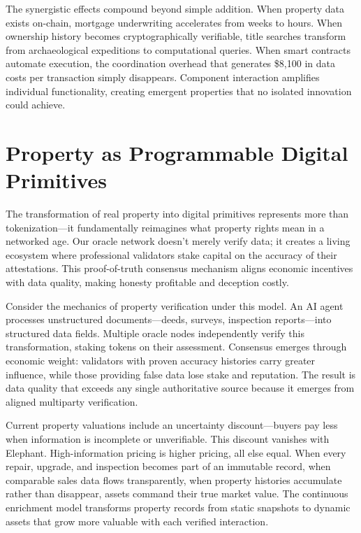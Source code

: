 The synergistic effects compound beyond simple addition. When property data exists on-chain, mortgage underwriting accelerates from weeks to hours. When ownership history becomes cryptographically verifiable, title searches transform from archaeological expeditions to computational queries. When smart contracts automate execution, the coordination overhead that generates \$8{,}100 in data costs per transaction simply disappears. Component interaction amplifies individual functionality, creating emergent properties that no isolated innovation could achieve.

\section{Property as Programmable Digital Primitives}

The transformation of real property into digital primitives represents more than tokenization—it fundamentally reimagines what property rights mean in a networked age. Our oracle network doesn't merely verify data; it creates a living ecosystem where professional validators stake capital on the accuracy of their attestations. This proof-of-truth consensus mechanism aligns economic incentives with data quality, making honesty profitable and deception costly.

Consider the mechanics of property verification under this model. An AI agent processes unstructured documents—deeds, surveys, inspection reports—into structured data fields. Multiple oracle nodes independently verify this transformation, staking tokens on their assessment. Consensus emerges through economic weight: validators with proven accuracy histories carry greater influence, while those providing false data lose stake and reputation. The result is data quality that exceeds any single authoritative source because it emerges from aligned multiparty verification.

Current property valuations include an uncertainty discount—buyers pay less when information is incomplete or unverifiable. This discount vanishes with Elephant. High-information pricing is higher pricing, all else equal. When every repair, upgrade, and inspection becomes part of an immutable record, when comparable sales data flows transparently, when property histories accumulate rather than disappear, assets command their true market value. The continuous enrichment model transforms property records from static snapshots to dynamic assets that grow more valuable with each verified interaction.

